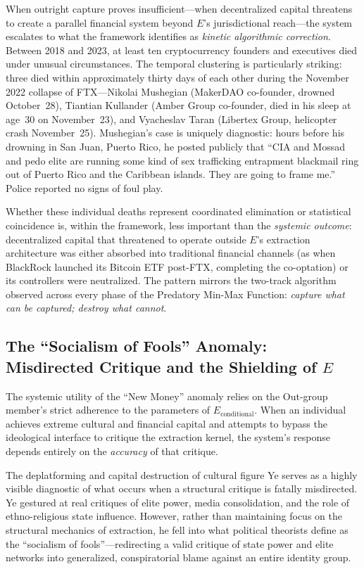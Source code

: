 \documentclass[12pt,openany]{book}
\begin{document}
When outright capture proves insufficient---when decentralized capital threatens to create a parallel financial system beyond $E$'s jurisdictional reach---the system escalates to what the framework identifies as \textit{kinetic algorithmic correction}. Between 2018 and 2023, at least ten cryptocurrency founders and executives died under unusual circumstances. The temporal clustering is particularly striking: three died within approximately thirty days of each other during the November 2022 collapse of FTX---Nikolai Mushegian (MakerDAO co-founder, drowned October~28), Tiantian Kullander (Amber Group co-founder, died in his sleep at age~30 on November~23), and Vyacheslav Taran (Libertex Group, helicopter crash November~25). Mushegian's case is uniquely diagnostic: hours before his drowning in San Juan, Puerto Rico, he posted publicly that ``CIA and Mossad and pedo elite are running some kind of sex trafficking entrapment blackmail ring out of Puerto Rico and the Caribbean islands. They are going to frame me.'' Police reported no signs of foul play.

Whether these individual deaths represent coordinated elimination or statistical coincidence is, within the framework, less important than the \textit{systemic outcome}: decentralized capital that threatened to operate outside $E$'s extraction architecture was either absorbed into traditional financial channels (as when BlackRock launched its Bitcoin ETF post-FTX, completing the co-optation) or its controllers were neutralized. The pattern mirrors the two-track algorithm observed across every phase of the Predatory Min-Max Function: \textit{capture what can be captured; destroy what cannot}.

\subsection{The ``Socialism of Fools'' Anomaly: Misdirected Critique and the Shielding of $E$}

The systemic utility of the ``New Money'' anomaly relies on the Out-group member's strict adherence to the parameters of $E_{\text{conditional}}$. When an individual achieves extreme cultural and financial capital and attempts to bypass the ideological interface to critique the extraction kernel, the system's response depends entirely on the \textit{accuracy} of that critique.

The deplatforming and capital destruction of cultural figure Ye serves as a highly visible diagnostic of what occurs when a structural critique is fatally misdirected. Ye gestured at real critiques of elite power, media consolidation, and the role of ethno-religious state influence. However, rather than maintaining focus on the structural mechanics of extraction, he fell into what political theorists define as the ``socialism of fools''---redirecting a valid critique of state power and elite networks into generalized, conspiratorial blame against an entire identity group.
\end{document}
